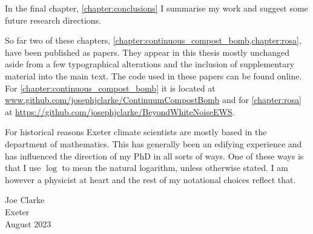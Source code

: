 In the final chapter, \cref{chapter:conclusions} I summarise my work and suggest some future research directions.

So far two of these chapters, \cref{chapter:continuous_compost_bomb,chapter:rosa}, have been published as papers. They appear in this thesis mostly unchanged
aside from a few typographical alterations and the inclusion of supplementary material into the main text. The code used in these papers can be found online. 
For \cref{chapter:continuous_compost_bomb} it is located at \url{www.github.com/josephjclarke/ContinuumCompostBomb} and for
\cref{chapter:rosa} at \url{https://github.com/josephjclarke/BeyondWhiteNoiseEWS}.

For historical reasons Exeter climate scientists are mostly based in the department of mathematics. This has generally been an edifying experience and has influenced the
direction of my PhD in all sorts of ways. One of these ways is that I use $\log$ to mean the natural logarithm, unless otherwise stated. I am however a physicist
at heart and the rest of my notational choices reflect that.

\begin{flushright}
  Joe Clarke\\
  Exeter\\
  August 2023
\end{flushright}